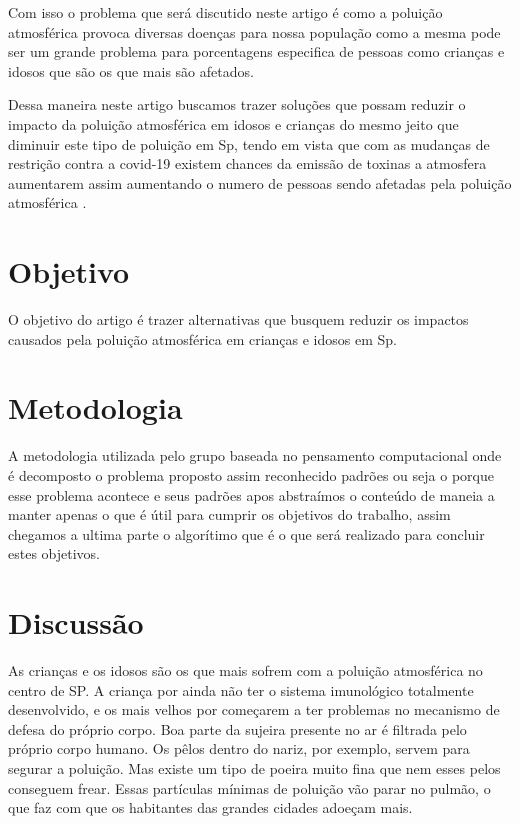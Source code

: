 \documentclass[
	article,			%
	11pt,				%
	oneside,			%
	a4paper,			%
	english,			%
	brazil,				%
	sumario=tradicional
	]{abntex2}
\begin{document}
Com isso o problema que será discutido neste artigo é como a poluição atmosférica provoca diversas doenças para nossa população como a mesma pode ser um grande problema para porcentagens especifica de pessoas como crianças e idosos que são os que mais são afetados.  

Dessa maneira neste artigo buscamos trazer soluções que possam reduzir o impacto da poluição atmosférica em idosos e crianças do mesmo jeito que diminuir este tipo de poluição em Sp, tendo em vista que com as mudanças de restrição contra a covid-19 existem chances da emissão de toxinas a atmosfera aumentarem assim aumentando o numero de pessoas sendo afetadas pela poluição atmosférica .

\section{Objetivo}
O objetivo do artigo é trazer alternativas que busquem reduzir os impactos causados pela poluição atmosférica em crianças e idosos em Sp.

\section{Metodologia}
A metodologia utilizada pelo grupo baseada no pensamento computacional onde é decomposto o problema proposto assim reconhecido padrões ou seja o porque esse problema acontece e seus padrões apos abstraímos o conteúdo de maneia a manter apenas o que é útil para cumprir os objetivos do trabalho, assim chegamos a ultima parte o algorítimo que é o que será realizado para concluir estes objetivos.
\section{Discussão}

As crianças e os idosos são os que mais sofrem com a poluição atmosférica no centro de SP. 
A criança por ainda não ter o sistema imunológico totalmente desenvolvido, e os mais velhos por começarem a ter problemas no mecanismo de defesa do próprio corpo. 
Boa parte da sujeira presente no ar é filtrada pelo próprio corpo humano. Os pêlos dentro do nariz, por exemplo, servem para segurar a poluição. Mas existe um tipo de poeira muito fina que nem esses pelos conseguem frear. Essas partículas mínimas de poluição vão parar no pulmão, o que faz com que os habitantes das grandes cidades adoeçam mais.
\end{document}
